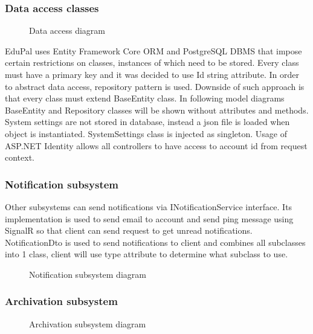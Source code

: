 \documentclass[
    english, %
]{VUMIFPSkursinis}
\begin{document}
\subsubsection{Data access classes}

\begin{figure}[ht]
    \centering
    
    \caption{Data access diagram}
    \label{data-access-model}
\end{figure}

EduPal uses Entity Framework Core ORM and PostgreSQL DBMS that impose certain restrictions on classes, instances of which need to be stored. Every class must have a primary key and it was decided to use Id string attribute. In order to abstract data access, repository pattern is used. Downside of such approach is that every class must extend BaseEntity class. In following model diagrams BaseEntity and Repository classes will be shown without attributes and methods. System settings are not stored in database, instead a json file is loaded when object is instantiated. SystemSettings class is injected as singleton. Usage of ASP.NET Identity allows all controllers to have access to account id from request context.

\subsubsection{Notification subsystem}

Other subsystems can send notifications via INotificationService interface. Its implementation is used to send email to account and send ping message using SignalR so that client can send request to get unread notifications. NotificationDto is used to send notifications to client and combines all subclasses into 1 class, client will use type attribute to determine what subclass to use.

\begin{figure}[ht]
    \centering
    
    \caption{Notification subsystem diagram}
    \label{notification-model}
\end{figure}

\subsubsection{Archivation subsystem}

\begin{figure}[ht]
    \centering
    
    \caption{Archivation subsystem diagram}
    \label{archivation-model}
\end{figure}
\end{document}
